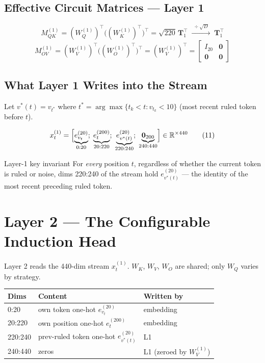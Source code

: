 \documentclass[11pt]{article}
\newcommand{\R}{\mathbb{R}}
\begin{document}
\subsection{Effective Circuit Matrices --- Layer 1}

\[
M_{QK}^{(1)}=(W_Q^{(1)})^\top\bigl((W_K^{(1)})^\top\bigr)^\top
=\sqrt{220}\,\boldsymbol{T}_1^\top
\;\xrightarrow{\;\div\sqrt{D}\;}\;\boldsymbol{T}_1^\top
\tag{9}
\]
\[
M_{OV}^{(1)}=(W_V^{(1)})^\top\bigl((W_O^{(1)})^\top\bigr)^\top
=(W_V^{(1)})^\top
=\begin{bmatrix}I_{20}&\mathbf{0}\\\mathbf{0}&\mathbf{0}\end{bmatrix}
\tag{10}
\]

\subsection{What Layer 1 Writes into the Stream}

Let $v^*(t)=v_{t^*}$ where $t^*=\arg\max\{t_k<t:v_{t_k}<10\}$ (most recent ruled token before $t$).

\[
x_t^{(1)}=\Bigl[
\underbrace{e_{v_t}^{(20)}}_{0\text{:}20};\;
\underbrace{e_t^{(200)}}_{20\text{:}220};\;
\underbrace{e_{v^*(t)}^{(20)}}_{220\text{:}240};\;
\underbrace{\mathbf{0}_{200}}_{240\text{:}440}
\Bigr]\in\R^{\times440}
\tag{11}
\]

\begin{warningbox}{Layer-1 key invariant}
For \emph{every} position $t$, regardless of whether the current token is ruled or noise, dims 220:240
of the stream hold $e_{v^*(t)}^{(20)}$ --- the identity of the most recent preceding ruled token.
\end{warningbox}

\section{Layer 2 --- The Configurable Induction Head}

Layer 2 reads the 440-dim stream $x_t^{(1)}$. $W_K$, $W_V$, $W_O$ are shared; only $W_Q$ varies
by strategy.

\begin{center}
\begin{tabular}{lll}
\toprule
\textbf{Dims} & \textbf{Content} & \textbf{Written by}\\
\midrule
0:20    & own token one-hot $e_{v_t}^{(20)}$             & embedding\\
20:220  & own position one-hot $e_t^{(200)}$             & embedding\\
220:240 & prev-ruled token one-hot $e_{v^*(t)}^{(20)}$   & L1\\
240:440 & zeros                                           & L1 (zeroed by $W_V^{(1)}$)\\
\bottomrule
\end{tabular}
\end{center}
\end{document}
